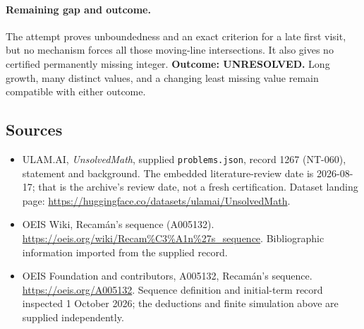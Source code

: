 \documentclass[11pt,a4paper]{article}
\begin{document}
\paragraph{Remaining gap and outcome.}
The attempt proves unboundedness and an exact criterion for a late
first visit, but no mechanism forces all those moving-line
intersections. It also gives no certified permanently missing integer.
\textbf{Outcome: UNRESOLVED.} Long growth, many distinct values, and
a changing least missing value remain compatible with either outcome.

\subsection{Sources}

{\small

\begin{itemize}

\item[\hypertarget{source:1267:1}{S1}] ULAM.AI, \emph{UnsolvedMath}, supplied \texttt{problems.json}, record 1267 (NT-060), statement and background. The embedded literature-review date is 2026-08-17; that is the archive’s review date, not a fresh certification. Dataset landing page: \url{https://huggingface.co/datasets/ulamai/UnsolvedMath}.

\item[\hypertarget{source:1267:2}{S2}] OEIS Wiki, Recamán's sequence (A005132). \url{https://oeis.org/wiki/Recam%C3%A1n%27s_sequence}. Bibliographic information imported from the supplied record.


\item[E1] OEIS Foundation and contributors, A005132,
Recam\'an's sequence. \url{https://oeis.org/A005132}.
Sequence definition and initial-term record inspected 1 October 2026;
the deductions and finite simulation above are supplied independently.

\end{itemize}

}

\label{end:1267}
\end{document}
